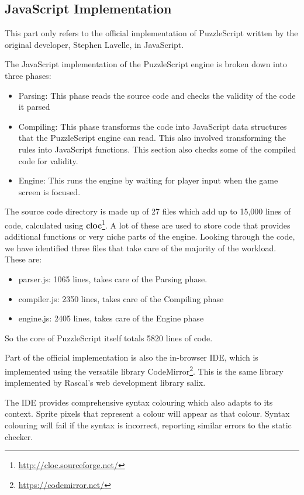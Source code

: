 \subsection{JavaScript Implementation}
This part only refers to the official implementation of PuzzleScript written by the original developer, Stephen Lavelle, in JavaScript.

The JavaScript implementation of the PuzzleScript engine is broken down into three phases:
\begin{itemize}
    \item Parsing: This phase reads the source code and checks the validity of the code it parsed
    \item Compiling: This phase transforms the code into JavaScript data structures that the PuzzleScript engine can read. This also involved transforming the rules into JavaScript functions. This section also checks some of the compiled code for validity.
    \item Engine: This runs the engine by waiting for player input when the game screen is focused.
\end{itemize}

The source code directory is made up of 27 files which add up to 15,000 lines of code, calculated using \textbf{cloc}\footnote{\url{http://cloc.sourceforge.net/}}. A lot of these are used to store code that provides additional functions or very niche parts of the engine. Looking through the code, we have identified three files that take care of the majority of the workload. These are:
\begin{itemize}
    \item parser.js: 1065 lines, takes care of the Parsing phase.
    \item compiler.js: 2350 lines, takes care of the Compiling phase
    \item engine.js: 2405 lines, takes care of the Engine phase
\end{itemize}

So the core of PuzzleScript itself totals 5820 lines of code. 

Part of the official implementation is also the in-browser IDE, which is implemented using the versatile library CodeMirror\footnote{\url{https://codemirror.net/}}. This is the same library implemented by Rascal's web development library salix. 

The IDE provides comprehensive syntax colouring which also adapts to its context. Sprite pixels that represent a colour will appear as that colour. Syntax colouring will fail if the syntax is incorrect, reporting similar errors to the static checker. 

